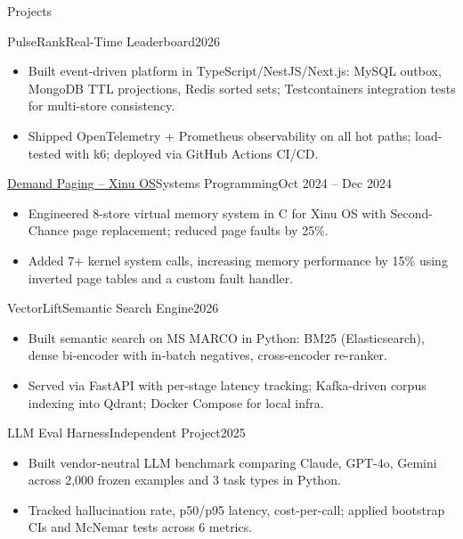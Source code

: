 \documentclass[]{mcdowellcv}
\begin{document}
\begin{cvsection}{Projects}
  \begin{cvsubsection}{PulseRank}{Real-Time Leaderboard}{2026}
    \begin{itemize}
      \item Built event-driven platform in TypeScript/NestJS/Next.js: MySQL outbox, MongoDB TTL projections, Redis sorted sets; Testcontainers integration tests for multi-store consistency.
      \item Shipped OpenTelemetry + Prometheus observability on all hot paths; load-tested with k6; deployed via GitHub Actions CI/CD.
    \end{itemize}
    \vspace{-1.5pt}
  \end{cvsubsection}

  \begin{cvsubsection}{\href{https://github.com/ncsu-csc-501/project3-mndedhia_akulka26_aapai}{Demand Paging -- Xinu OS}}{Systems Programming}{Oct 2024 -- Dec 2024}
    \begin{itemize}
      \item Engineered 8-store virtual memory system in C for Xinu OS with Second-Chance page replacement; reduced page faults by 25\%.
      \item Added 7+ kernel system calls, increasing memory performance by 15\% using inverted page tables and a custom fault handler.
    \end{itemize}
    \vspace{-1.5pt}
  \end{cvsubsection}

  \begin{cvsubsection}{VectorLift}{Semantic Search Engine}{2026}
    \begin{itemize}
      \item Built semantic search on MS MARCO in Python: BM25 (Elasticsearch), dense bi-encoder with in-batch negatives, cross-encoder re-ranker.
      \item Served via FastAPI with per-stage latency tracking; Kafka-driven corpus indexing into Qdrant; Docker Compose for local infra.
    \end{itemize}
    \vspace{-1.5pt}
  \end{cvsubsection}

  \begin{cvsubsection}{LLM Eval Harness}{Independent Project}{2025}
    \begin{itemize}
      \item Built vendor-neutral LLM benchmark comparing Claude, GPT-4o, Gemini across 2,000 frozen examples and 3 task types in Python.
      \item Tracked hallucination rate, p50/p95 latency, cost-per-call; applied bootstrap CIs and McNemar tests across 6 metrics.
    \end{itemize}
  \end{cvsubsection}
\end{cvsection}
\end{document}
